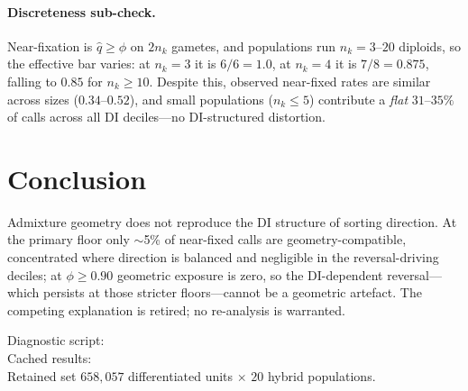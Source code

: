 \documentclass[11pt]{article}
\begin{document}
\paragraph{Discreteness sub-check.} Near-fixation is $\hat q\ge\phi$ on $2n_k$ gametes, and
populations run $n_k=3$--$20$ diploids, so the effective bar varies: at $n_k=3$ it is $6/6=1.0$,
at $n_k=4$ it is $7/8=0.875$, falling to $0.85$ for $n_k\ge10$. Despite this, observed near-fixed
rates are similar across sizes ($0.34$--$0.52$), and small populations ($n_k\le5$) contribute a
\emph{flat} $31$--$35\%$ of calls across all DI deciles---no DI-structured distortion.

\section*{Conclusion}
Admixture geometry does not reproduce the DI structure of sorting direction. At the primary
floor only $\sim$5\% of near-fixed calls are geometry-compatible, concentrated where direction is
balanced and negligible in the reversal-driving deciles; at $\phi\ge0.90$ geometric exposure is
zero, so the DI-dependent reversal---which persists at those stricter floors---cannot be a
geometric artefact. The competing explanation is retired; no re-analysis is warranted.

\vfill
{\footnotesize\color{gray}
Diagnostic script: \\
Cached results: \\
Retained set $658{,}057$ differentiated units $\times$ $20$ hybrid populations.}
\end{document}
